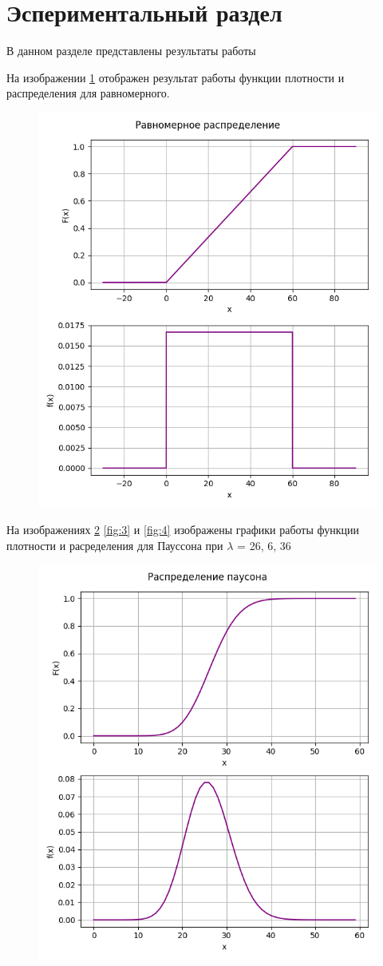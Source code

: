 \newpage
\section{Эспериментальный раздел}
В данном разделе представлены результаты работы

На изображении \ref{fig:1} отображен результат работы функции плотности и распределения для равномерного.

\begin{figure}[H]
	\centering
	\includegraphics[width=0.7\linewidth]{src/1}
	\caption{}
	\label{fig:1}
\end{figure}

На изображениях \ref{fig:2} \ref{fig:3} и \ref{fig:4} изображены графики работы функции плотности и расределения для Пауссона при $\lambda$ = 26, 6, 36

\begin{figure}[H]
	\centering
	\includegraphics[width=0.7\linewidth]{src/2}
	\caption{}
	\label{fig:2}
\end{figure}



